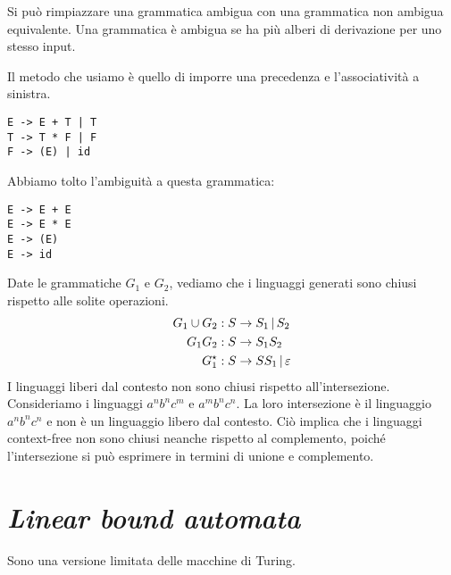 Si pu\`o rimpiazzare una grammatica ambigua con una grammatica non ambigua equivalente.
Una grammatica \`e ambigua se ha pi\`u alberi di derivazione per uno stesso input.

Il metodo che usiamo \`e quello di imporre una precedenza e l'associativit\`a a sinistra.
\begin{verbatim}
E -> E + T | T 
T -> T * F | F
F -> (E) | id
\end{verbatim}
Abbiamo tolto l'ambiguit\`a a questa grammatica:
\begin{verbatim}
E -> E + E
E -> E * E
E -> (E)
E -> id
\end{verbatim}
Date le grammatiche $G_1$ e $G_2$, vediamo che i linguaggi generati sono chiusi rispetto alle solite operazioni.
\begin{align*}
	G_1 \cup G_2 & : S \to S_1 \, | \, S_2 \\
	G_1 G_2 & : S \to S_1 S_2 \\
	G_1^{\star} & : S \to S S_1 \, | \, \varepsilon
\end{align*}
I linguaggi liberi dal contesto non sono chiusi rispetto all'intersezione.
Consideriamo i linguaggi $a^n b^n c^m$ e $a^m b^n c^n$.
La loro intersezione \`e il linguaggio $a^n b^n c^n$ e non \`e un linguaggio libero dal contesto.
Ci\`o implica che i linguaggi context-free non sono chiusi neanche rispetto al complemento, poich\'e l'intersezione si pu\`o esprimere in termini di unione e complemento.

\section{\emph{Linear bound automata}}

Sono una versione limitata delle macchine di Turing.

